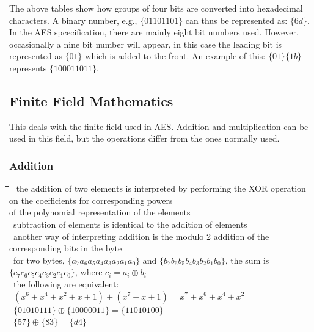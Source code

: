 \documentclass[10pt,letterpaper]{scrartcl}
\newcommand{\tbul}{\textbullet}
\newcommand{\tend}{\>\textendash}
\newcommand{\tasc}{\>\>\textasteriskcentered}
\newcommand{\tabDef}{\hspace{2em}\=\hspace{2em}\=\hspace{2em}\=\hspace{2em}\=\kill}
\begin{document}
The above tables show how groups of four bits are converted into hexadecimal characters. A binary number, e.g., $\{01101101\}$ can thus be represented as: $\{6d\}$. In the AES spcecification, there are mainly eight bit numbers used. However, occasionally a nine bit number will appear, in this case the leading bit is represented as $\{01\}$ which is added to the front. An example of this: $\{01\}\{1b\}$ represents $\{100011011\}$.
\subsection{Finite Field Mathematics}
This deals with the finite field used in AES. Addition and multiplication can be used in this field, but the operations differ from the ones normally used. 
\subsubsection*{Addition}\begin{tabbing}\tabDef
\tbul\ the addition of two elements is interpreted by performing the XOR operation on the coefficients for corresponding powers \\ of the polynomial representation of the elements \\
\tbul\ subtraction of elements is identical to the addition of elements \\
\tbul\ another way of interpreting addition is the modulo 2 addition of the corresponding bits in the byte \\
\tend\ for two bytes, $\{a_7a_6a_5a_4a_3a_2a_1a_0\}$ and $\{b_7b_6b_5b_4b_3b_2b_1b_0\}$, the sum is $\{c_7c_6c_5c_4c_3c_2c_1c_0\}$, where $c_i = a_i \oplus b_i$ \\
\tend\ the following are equivalent: \\
\tasc\ $(x^6+x^4+x^2+x+1)+(x^7+x+1)=x^7+x^6+x^4+x^2$\\
\tasc\ $\{01010111\}\oplus \{10000011\}=\{11010100\}$ \\
\tasc\ $\{57\}\oplus \{83\}=\{d4\}$\end{tabbing}
\end{document}

